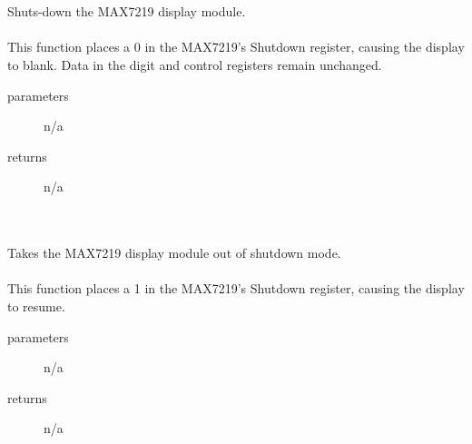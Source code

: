 \begin{itemize}
{             \\ \\
                Shuts-down the MAX7219 display module. \\ \\
                This function places a 0 in the MAX7219's Shutdown register, causing the display to blank.
                Data in the digit and control registers remain unchanged.
                \begin{description}
                    \item[parameters] n/a
                    \item[returns] n/a
                \end{description}

             \\ \\
                Takes the MAX7219 display module out of shutdown mode. \\ \\
                This function places a 1 in the MAX7219's Shutdown register, causing the display to resume.
                \begin{description}
                    \item[parameters] n/a
                    \item[returns] n/a
                \end{description}
        }{}

\end{itemize}
